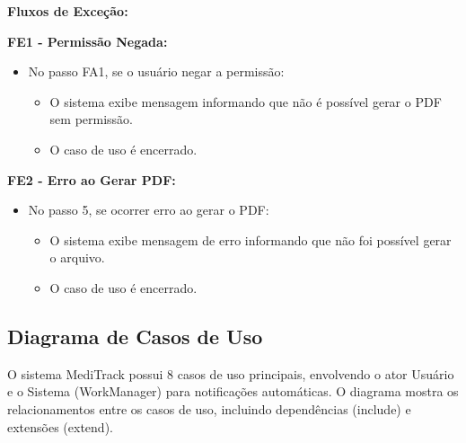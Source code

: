 \documentclass[12pt]{article}
\begin{document}
\textbf{Fluxos de Exceção:}

\textbf{FE1 - Permissão Negada:}
\begin{itemize}
    \item No passo FA1, se o usuário negar a permissão:
    \begin{itemize}
        \item O sistema exibe mensagem informando que não é possível gerar o PDF sem permissão.
        \item O caso de uso é encerrado.
    \end{itemize}
\end{itemize}

\textbf{FE2 - Erro ao Gerar PDF:}
\begin{itemize}
    \item No passo 5, se ocorrer erro ao gerar o PDF:
    \begin{itemize}
        \item O sistema exibe mensagem de erro informando que não foi possível gerar o arquivo.
        \item O caso de uso é encerrado.
    \end{itemize}
\end{itemize}

\subsection{Diagrama de Casos de Uso}

O sistema MediTrack possui 8 casos de uso principais, envolvendo o ator Usuário e o Sistema (WorkManager) para notificações automáticas. O diagrama mostra os relacionamentos entre os casos de uso, incluindo dependências (include) e extensões (extend).
\end{document}
